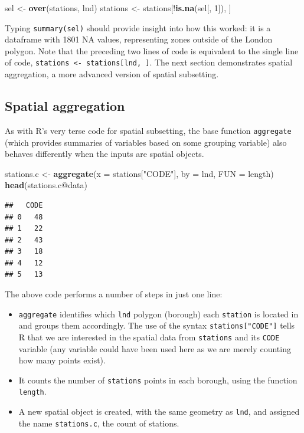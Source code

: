 \documentclass[]{article}
\newenvironment{Shaded}{}{}
\newcommand{\KeywordTok}[1]{\textcolor[rgb]{0.00,0.44,0.13}{\textbf{{#1}}}}
\newcommand{\DataTypeTok}[1]{\textcolor[rgb]{0.56,0.13,0.00}{{#1}}}
\newcommand{\DecValTok}[1]{\textcolor[rgb]{0.25,0.63,0.44}{{#1}}}
\newcommand{\StringTok}[1]{\textcolor[rgb]{0.25,0.44,0.63}{{#1}}}
\newcommand{\NormalTok}[1]{{#1}}
\begin{document}
\begin{Shaded}
\begin{Highlighting}[]
\NormalTok{sel <-}\StringTok{ }\KeywordTok{over}\NormalTok{(stations, lnd)}
\NormalTok{stations <-}\StringTok{ }\NormalTok{stations[!}\KeywordTok{is.na}\NormalTok{(sel[, }\DecValTok{1}\NormalTok{]), ]}
\end{Highlighting}
\end{Shaded}

Typing \texttt{summary(sel)} should provide insight into how this
worked: it is a dataframe with 1801 NA values, representing zones
outside of the London polygon. Note that the preceding two lines of code
is equivalent to the single line of code,
\texttt{stations \textless{}- stations{[}lnd, {]}}. The next section
demonstrates spatial aggregation, a more advanced version of spatial
subsetting.

\subsection{Spatial aggregation}\label{spatial-aggregation}

As with R's very terse code for spatial subsetting, the base function
\texttt{aggregate} (which provides summaries of variables based on some
grouping variable) also behaves differently when the inputs are spatial
objects.

\begin{Shaded}
\begin{Highlighting}[]
\NormalTok{stations.c <-}\StringTok{ }\KeywordTok{aggregate}\NormalTok{(}\DataTypeTok{x =} \NormalTok{stations[}\StringTok{"CODE"}\NormalTok{], }\DataTypeTok{by =} \NormalTok{lnd, }\DataTypeTok{FUN =} \NormalTok{length)}
\KeywordTok{head}\NormalTok{(stations.c@data)}
\end{Highlighting}
\end{Shaded}

\begin{verbatim}
##   CODE
## 0   48
## 1   22
## 2   43
## 3   18
## 4   12
## 5   13
\end{verbatim}

The above code performs a number of steps in just one line:

\begin{itemize}
\itemsep1pt\parskip0pt
\item
  \texttt{aggregate} identifies which \texttt{lnd} polygon (borough)
  each \texttt{station} is located in and groups them accordingly. The
  use of the syntax \texttt{stations{[}"CODE"{]}} tells R that we are
  interested in the spatial data from \texttt{stations} and its
  \texttt{CODE} variable (any variable could have been used here as we
  are merely counting how many points exist).
\item
  It counts the number of \texttt{stations} points in each borough,
  using the function \texttt{length}.
\item
  A new spatial object is created, with the same geometry as
  \texttt{lnd}, and assigned the name \texttt{stations.c}, the count of
  stations.
\end{itemize}
\end{document}
